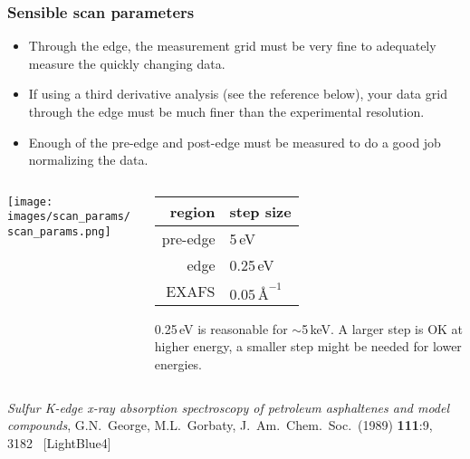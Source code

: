 \documentclass[10pt, xcolor=x11names, compress]{beamer}
\begin{document}
\begin{frame}
  \frametitle{Sensible scan parameters}
  \begin{itemize}
  \item Through the edge, the measurement grid must be very fine to
    adequately measure the quickly changing data.
  \item If using a third derivative analysis (see the reference
    below), your data grid through the edge must be much finer than
    the experimental resolution.
  \item Enough of the pre-edge and post-edge must be measured to do a
    good job normalizing the data.
  \end{itemize}

  \begin{columns}
    \begin{column}{0.5\linewidth}
      \texttt{[image: images/scan\_params/scan\_params.png]}
    \end{column}
    \begin{column}{0.5\linewidth}
      \begin{tabular}[h]{rl}
        region & step size\\
        \hline
        \color{Red2}pre-edge & \color{Red2}5\,eV\\
        \color{Green4}edge   & \color{Green4}0.25\,eV\\
        \color{Blue3}EXAFS   & \color{Blue3}$0.05\,\textrm{\AA}^{-1}$\\
      \end{tabular}

      \smallskip

      \small%
      {\color{Green4}0.25\,eV} is reasonable for $\sim$5\,keV.  A
      larger step is OK at higher energy, a smaller step might be
      needed for lower energies.
    \end{column}
  \end{columns}

  \begin{bottomnote}[0.5][19] 
    \textit{Sulfur K-edge x-ray absorption spectroscopy of petroleum
    asphaltenes and model compounds},
    G.N.\ George, M.L.\ Gorbaty,
    J.\ Am.\ Chem.\ Soc.\ (1989) \textbf{111}:9, 3182~
    [LightBlue4]
  \end{bottomnote}
\end{frame}
\end{document}
